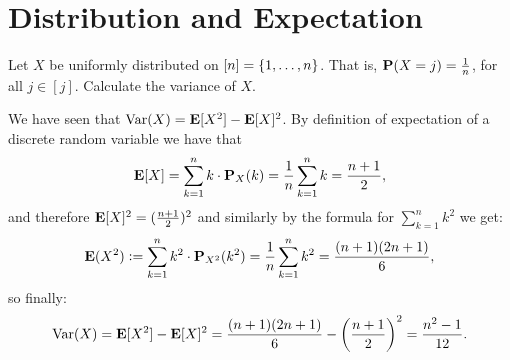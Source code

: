 \documentclass[11pt,a4paper]{article}
\begin{document}
\newpage

\section{Distribution and Expectation}

\begin{exercise}
  Let $X$ be uniformly distributed on $[n] = \left\{1,\dots,n\right\}$.
  That is, $\mathbf{P}(X = j) = \frac{1}{n}$,
  for all $j \in [j]$.
  Calculate the variance of $X$.
\end{exercise}
\begin{solution}
  We have seen that $\operatorname{Var}(X) = \mathbf{E}[X^2] - \mathbf{E}[X]^2$.
  By definition of expectation of a discrete random variable we have that
  \[
    \mathbf{E}[X] =
    \sum_{k=1}^{n} k \cdot \mathbf{P}_X(k) =
    \frac{1}{n} \sum_{k=1}^{n} k =
    \frac{n + 1}{2},
  \]
  and therefore $\mathbf{E}[X]^2 = (\frac{n + 1}{2})^2$
  and similarly by the formula for $\sum_{k=1}^{n} k^2$ we get:
  \[
    \mathbf{E}(X^2) :=
    \sum_{k=1}^{n} k^2 \cdot \mathbf{P}_{X^2}(k^2) =
    \frac{1}{n} \sum_{k=1}^{n} k^2 =
    \frac{(n + 1)(2n + 1)}{6},
  \]
  so finally:
  \[
    \Var(X) =
    \E[X^2] - \E[X]^2 =
    \frac{(n + 1)(2n + 1)}{6} - \del{\frac{n + 1}{2}}^2 =
    \frac{n^2 - 1}{12}.
  \]
\end{solution}
\end{document}
